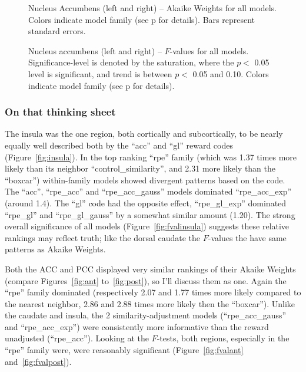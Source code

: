 \documentclass[doc,12pt]{apa}        %
\begin{document}
\begin{figure}[tp]
    \centering
    \caption{Nucleus Accumbens (left and right) -- Akaike Weights for all models.  Colors indicate model family (see p\pageref{sub:cmb} for details). Bars represent standard errors.}
	\label{fig:accumbens}
\end{figure}
\begin{figure}[tp]
    \centering
    \caption{Nucleus accumbens (left and right) -- $F$-values for all models.
    Significance-level is denoted by the saturation, where the $p <$ 0.05 level is
    significant, and trend is between $p <$ 0.05 and 0.10.  Colors indicate model family (see p\pageref{sub:cmb} for details).}
	\label{fig:fvalaccumbens}
\end{figure}

\subsubsection{On that thinking sheet}
\label{subsub:onsheet}
The insula was the one region, both cortically and subcortically, to be nearly equally well described both by the ``acc'' and ``gl'' reward codes (Figure~\ref{fig:insula}).  In the top ranking ``rpe'' family (which was 1.37 times more likely than its neighbor ``control\_similarity'', and 2.31 more likely than the ``boxcar'') within-family models showed divergent patterns based on the code.  The ``acc'', ``rpe\_acc'' and ``rpe\_acc\_gauss'' models dominated ``rpe\_acc\_exp'' (around 1.4).  The ``gl'' code had the opposite effect, ``rpe\_gl\_exp'' dominated ``rpe\_gl'' and ``rpe\_gl\_gauss'' by a somewhat similar amount (1.20).  The strong overall significance of all models (Figure~\ref{fig:fvalinsula}) suggests these relative rankings may reflect truth; like the dorsal caudate the $F$-values the have same patterns as Akaike Weights.

Both the ACC and PCC displayed very similar rankings of their Akaike Weights (compare Figures~\ref{fig:ant} to~\ref{fig:post}), so I'll discuss them as one.  Again the ``rpe'' family dominated (respectively 2.07 and 1.77 times more likely compared to the nearest neighbor, 2.86 and 2.88 times more likely then the ``boxcar'').  Unlike the caudate and insula, the 2 similarity-adjustment models (``rpe\_acc\_gauss'' and ``rpe\_acc\_exp'') were consistently more informative than the reward unadjusted (``rpe\_acc'').  Looking at the $F$-tests, both regions, especially in the ``rpe'' family were, were reasonably significant (Figure~\ref{fig:fvalant} and~\ref{fig:fvalpost}).
\end{document}
